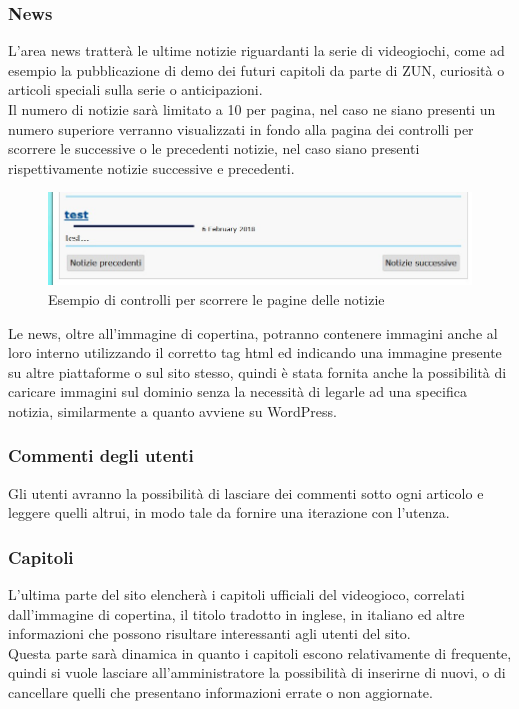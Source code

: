 \documentclass[openany, a4paper, 12pt]{report}
\begin{document}
		\subsubsection{News}
		L'area news tratterà le ultime notizie riguardanti la serie di videogiochi, come ad esempio la pubblicazione di demo dei futuri capitoli da parte di ZUN, curiosità o articoli speciali sulla serie o anticipazioni.\\
		Il numero di notizie sarà limitato a 10 per pagina, nel caso ne siano presenti un numero superiore verranno visualizzati in fondo alla pagina dei controlli per scorrere le successive o le precedenti notizie, nel caso siano presenti rispettivamente notizie successive e precedenti.
		\begin{figure}[H]
			\centering
			\includegraphics[width=0.8\linewidth]{images/precsuccnews}
			\caption{Esempio di controlli per scorrere le pagine delle notizie}
		\end{figure}
		Le news, oltre all'immagine di copertina, potranno contenere immagini anche al loro interno utilizzando il corretto tag html ed indicando una immagine presente su altre piattaforme o sul sito stesso, quindi è stata fornita anche la possibilità di caricare immagini sul dominio senza la necessità di legarle ad una specifica notizia, similarmente a quanto avviene su WordPress.

		\subsubsection{Commenti degli utenti}
		Gli utenti avranno la possibilità di lasciare dei commenti sotto ogni articolo e leggere quelli altrui, in modo tale da fornire una iterazione con l'utenza.

		\subsubsection{Capitoli}
		L'ultima parte del sito elencherà i capitoli ufficiali del videogioco, correlati dall'immagine di copertina, il titolo tradotto in inglese, in italiano ed altre informazioni che possono risultare interessanti agli utenti del sito.\\
		Questa parte sarà dinamica in quanto i capitoli escono relativamente di frequente, quindi si vuole lasciare all'amministratore la possibilità di inserirne di nuovi, o di cancellare quelli che presentano informazioni errate o non aggiornate.
\end{document}
